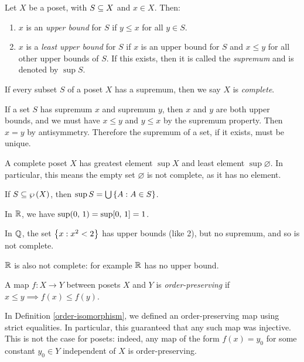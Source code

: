 \documentclass{article}
\begin{document}
\begin{definition}[Supremum]
	\label{supremum-upper-bound-complete}
    Let $X$ be a poset, with $S \subseteq X$ and $x \in X$. Then:
    \begin{enumerate}
    	\item $x$ is an \textit{upper bound} for $S$ if $y \leq x$ for all $y \in S$.
    	\item $x$ is a \textit{least upper bound} for $S$ if $x$ is an upper bound for $S$ and $x \leq y$ for all other upper bounds of $S$. If this exists, then it is called the \textit{supremum} and is denoted by $\sup S$.
	\end{enumerate}
	If every subset $S$ of a poset $X$ has a supremum, then we say $X$ is \textit{complete}.
\end{definition}

\begin{note}
	If a set $S$ has supremum $x$ and supremum $y$, then $x$ and $y$ are both upper bounds, and we must have $x \leq y$ and $y \leq x$ by the supremum property. Then $x = y$ by antisymmetry. Therefore the supremum of a set, if it exists, must be unique.
\end{note}

\begin{corollary}
    A complete poset $X$ has greatest element $\sup X$ and least element $\sup \varnothing$. In particular, this means the empty set $\varnothing$ is not complete, as it has no element.
\end{corollary}

\begin{example}[Supremum]
    If $S \subseteq \wp\left(X\right)$, then $\sup S = \bigcup \left\lbrace A : A \in S \right\rbrace$.
    
    In $\mathbb{R}$, we have $\sup (0, \, 1) = \sup [0, \, 1] = 1$.
    
    In $\mathbb{Q}$, the set $\left\lbrace x : x^2 < 2 \right\rbrace$ has upper bounds (like 2), but no supremum, and so is not complete.
    
    $\mathbb{R}$ is also not complete: for example $\mathbb{R}$ has no upper bound.
\end{example}

\begin{definition}
    A map $f : X \to Y$ between posets $X$ and $Y$ is \textit{order-preserving} if $x \leq y \implies f(x) \leq f(y)$.
\end{definition}

\begin{note}
	In Definition \ref{order-isomorphism}, we defined an order-preserving map using strict equalities. In particular, this guaranteed that any such map was injective. This is not the case for posets: indeed, any map of the form $f(x) = y_0$ for some constant $y_0 \in Y$ independent of $X$ is order-preserving.
\end{note}
\end{document}
